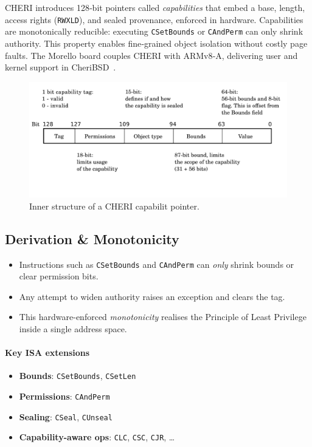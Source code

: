 \documentclass[sigconf]{acmart}
\begin{document}
CHERI introduces 128‑bit pointers called \emph{capabilities} that embed a base, length, access rights (\texttt{RWXLD}), and sealed provenance, enforced in hardware. Capabilities are monotonically reducible: executing \texttt{CSetBounds} or \texttt{CAndPerm} can only shrink authority. This property enables fine‑grained object isolation without costly page faults. The Morello board couples CHERI with ARMv8‑A, delivering user and kernel support in CheriBSD \cite{cheribsd}.  

\begin{figure}[h! tbp]
    \centering
    \includegraphics[width=0.9\columnwidth]{figures/cheri-3-1024x460.png}
    \caption{Inner structure of a CHERI capabilit pointer.}
    \label{fig:capability}
\end{figure}

\subsection{Derivation \& Monotonicity}

\begin{itemize}
  \item Instructions such as \texttt{CSetBounds} and \texttt{CAndPerm} can \emph{only} shrink bounds or clear permission bits.  
  \item Any attempt to widen authority raises an exception and clears the tag.  
  \item This hardware-enforced \emph{monotonicity} realises the Principle of Least Privilege inside a single address space.
\end{itemize}

\paragraph{Key ISA extensions}
\begin{itemize}
  \item \textbf{Bounds}: \texttt{CSetBounds}, \texttt{CSetLen}  
  \item \textbf{Permissions}: \texttt{CAndPerm}  
  \item \textbf{Sealing}: \texttt{CSeal}, \texttt{CUnseal}  
  \item \textbf{Capability-aware ops}: \texttt{CLC}, \texttt{CSC}, \texttt{CJR}, \dots
\end{itemize}
\end{document}
